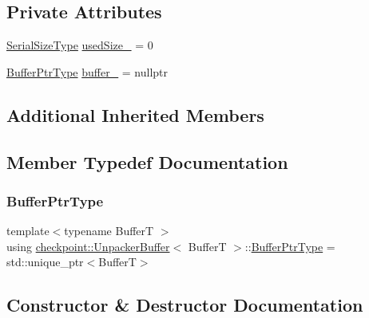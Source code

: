 \subsection*{Private Attributes}
\begin{DoxyCompactItemize}
\item 
\hyperlink{namespacecheckpoint_a083f6674da3f94c2901b18c6d238217c}{Serial\+Size\+Type} \hyperlink{structcheckpoint_1_1_unpacker_buffer_ad8bc7d5cd0a7f6b22169c982abf08965}{used\+Size\+\_\+} = 0
\item 
\hyperlink{structcheckpoint_1_1_unpacker_buffer_acdd2460fdb60fc584e04cb4069060613}{Buffer\+Ptr\+Type} \hyperlink{structcheckpoint_1_1_unpacker_buffer_a0e10a816952c340efd057727e91fe6fa}{buffer\+\_\+} = nullptr
\end{DoxyCompactItemize}
\subsection*{Additional Inherited Members}


\subsection{Member Typedef Documentation}
\mbox{\label{structcheckpoint_1_1_unpacker_buffer_acdd2460fdb60fc584e04cb4069060613}} 
\subsubsection{\texorpdfstring{Buffer\+Ptr\+Type}{BufferPtrType}}
{\footnotesize\ttfamily template$<$typename BufferT $>$ \\
using \hyperlink{structcheckpoint_1_1_unpacker_buffer}{checkpoint\+::\+Unpacker\+Buffer}$<$ BufferT $>$\+::\hyperlink{structcheckpoint_1_1_unpacker_buffer_acdd2460fdb60fc584e04cb4069060613}{Buffer\+Ptr\+Type} =  std\+::unique\+\_\+ptr$<$BufferT$>$}



\subsection{Constructor \& Destructor Documentation}
\mbox{\label{structcheckpoint_1_1_unpacker_buffer_a38d2f76f492c5dad5ab59747a6169e18}} 
